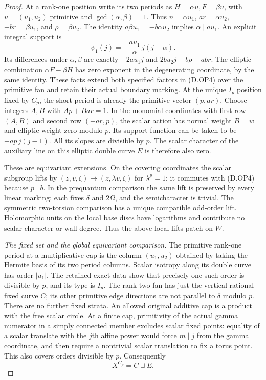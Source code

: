 \begin{proof}
At a rank-one position write its two periods as
$H=\alpha u,F=\beta u$, with $u=(u_1,u_2)$ primitive and
$\gcd(\alpha,\beta)=1$. Thus $n=\alpha u_1$,
$ar=\alpha u_2$, $-br=\beta u_1$, and $\rho=\beta u_2$.
The identity $a\beta u_1=-b\alpha u_2$ implies
$\alpha\mid au_1$. An explicit integral support is
\[
           \psi_1(j)=-\frac{au_1}{\alpha}\,j(j-\alpha).
 \tag{D.OP5a}
\]
Its differences under $\alpha,\beta$ are exactly
$-2au_1j$ and $2bu_2j+b\rho-ab r$.
The elliptic combination $\alpha F-\beta H$ has zero
exponent in the degenerating coordinate, by the same identity.
These facts extend both specified factors in (D.OP4) over the
primitive fan and retain their actual boundary marking.
At the unique $I_p$ position fixed by $C_p$, the short period
is already the primitive vector $(p,ar)$. Choose
integers $A,B$ with $Ap+B ar=1$. In the monomial coordinates
with first row $(A,B)$ and second row $(-ar,p)$, the scalar
action has normal weight $B=w$ and elliptic weight zero
modulo $p$. Its support function can be taken to be
$-ap\,j(j-1)$. All its slopes are divisible by $p$.
The scalar character of the auxiliary line on this elliptic
double curve $E$ is therefore also zero.

These are equivariant extensions. On the covering coordinates
the scalar subgroup lifts by $(z,v,\zeta)\mapsto
(z,\lambda v,\zeta)$ for $\lambda^p=1$; it commutes with
(D.OP4) because $p\mid b$. In the prequantum comparison the
same lift is preserved by every linear marking: each fixes
$\delta$ and $2\Omega$, and the semicharacter is trivial.
The symmetric two-torsion comparison has a unique compatible
odd-order lift. Holomorphic units on the local base discs
have logarithms and contribute no scalar character or wall
degree. Thus the above local lifts patch on $W$.

\emph{The fixed set and the global equivariant comparison.}
The primitive rank-one period at a multiplicative cap is the
column $(u_1,u_2)$ obtained by taking the Hermite basis of its
two period columns. Scalar isotropy along its double curve
has order $|u_1|$. The retained exact data show that precisely
one such order is divisible by $p$, and its type is $I_p$.
The rank-two fan has just the vertical rational fixed curve
$C$; its other primitive edge directions are not parallel to
$\delta$ modulo $p$. There are no further fixed strata.
An allowed original additive cap is a product with the free
scalar circle. At a finite cap, primitivity of the actual gamma
numerator in a simply connected member excludes scalar fixed
points: equality of a scalar translate with the $j$th affine
power would force $m\mid j$ from the gamma coordinate, and
then require a nontrivial scalar translation to fix a torus
point. This also covers orders divisible by $p$.
Consequently
\[
                         X^{C_p}=C\sqcup E.
 \tag{D.OP7}
\]


\end{proof}
